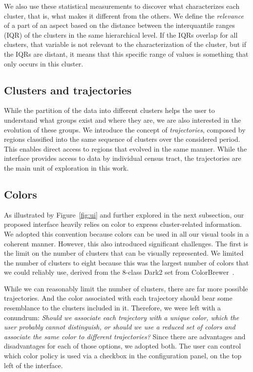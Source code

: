 We also use these statistical measurements to discover what characterizes each
cluster, that is, what makes it different from the others.  We define the
\emph{relevance} of a part of an aspect based on the distance between the
interquantile ranges (IQR) of the clusters in the same hierarchical level. If
the IQRs overlap for all clusters, that variable is not relevant to the
characterization of the cluster, but if the IQRs are distant, it means that this
specific range of values is something that only occurs in this cluster. 


\subsection{Clusters and trajectories}
While the partition of the data into different clusters helps the user to
understand what groups exist and where they are, we are also interested in the
evolution of these groups. We introduce the concept of \emph{trajectories},
composed by regions classified into the same sequence of clusters over the
considered period. This enables direct access to regions that evolved in the
same manner. While the interface provides access to data by individual census
tract, the trajectories are the main unit of exploration in this work.

\subsection{Colors}
\label{sec:colors}
As illustrated by Figure~\ref{fig:ui} and further explored in the next
subsection, our proposed interface heavily relies on color to express
cluster-related information. We adopted this convention because colors can be
used in all our visual tools in a coherent manner. However, this also introduced
significant challenges. The first is the limit on the number of clusters that
can be visually represented.  We limited the number of clusters to eight because
this was the largest number of colors that we could reliably use, derived from
the 8-class Dark2 set from ColorBrewer~\cite{ColorBrewer}. 

While we can reasonably limit the number of clusters, there are far more
possible trajectories. And the color associated with each trajectory should bear
some resemblance to the clusters included in it. Therefore, we were left with a
conundrum: \emph{Should we associate each trajectory with a unique color, which
the user probably cannot distinguish, or should we use a reduced set of colors
and associate the same color to different trajectories?} Since there are
advantages and disadvantages for each of those options, we adopted both. The
user can control which color policy is used via a checkbox in the configuration
panel, on the top left of the interface.

